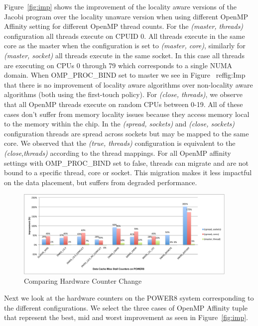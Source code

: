 Figure~\ref{fig:imp} shows the improvement of the locality aware versions of the Jacobi program over the locality unaware version when using different OpenMP Affinity setting for different OpenMP thread counts. 
For the \textit{(master, threads)} configuration all threads execute on CPUID 0. 
All threads execute in the same core as the master when the configuration is set to \textit{(master, core)}, similarly for \textit{(master, socket)} all threads execute in the same socket. In this case all threads are executing on CPUs 0 through 79 which corresponds to a single NUMA domain. When OMP\_PROC\_BIND set to master we see in Figure ~ref{fig:Imp} that there is no improvement of locality aware algorithms over non-locality aware algorithms (both using the first-touch policy).
For \textit{(close, threads)}, we observe that all OpenMP threads execute on random CPUs between 0-19. All of these cases don't suffer from memory locality issues because they access memory local to the memory within the chip.
In the \textit{(spread, sockets)} and \textit{(close, sockets)} configuration threads are spread across sockets but may be mapped to the same core. We observed that the \textit{(true, threads)} configuration is equivalent to the \textit{(close,threads)} according to the thread mappings.
For all OpenMP affinity settings  with OMP\_PROC\_BIND set to false, threads can migrate and are not bound to a specific thread, core or socket. This migration makes it less impactful on the data placement, but suffers from degraded performance.
\begin{figure}[h!]
  \centering
  \includegraphics[height=0.4\textwidth, width=0.95\textwidth]{./Images/HW.pdf}
       \caption{Comparing Hardware Counter Change}
       \label{fig:HW}
\end{figure}
%
Next we look at the hardware counters on the POWER8 system corresponding to the different configurations. 
We select the three cases of OpenMP Affinity tuple that represent the best, mid and worst improvement as seen in Figure~\ref{fig:imp}. 
